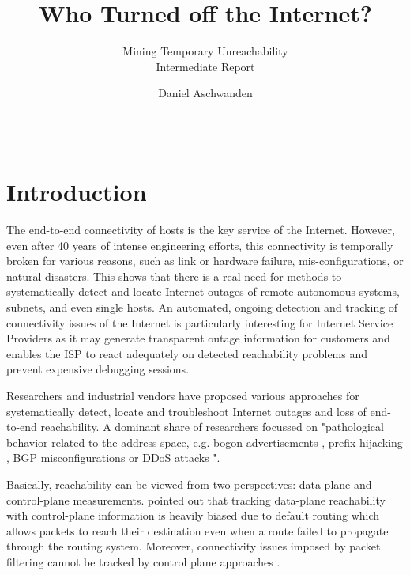 \documentclass{sigcomm-alternate}
\begin{document}
 
\title{Who Turned off the Internet?} 
\subtitle{Mining Temporary Unreachability\\ \Large Intermediate Report }

\author{ \alignauthor Daniel Aschwanden\\
\\
\\
}

\maketitle 
\section{Introduction}
The end-to-end connectivity of hosts is the key service of the Internet. However, even after 40 years of intense engineering efforts, this connectivity is temporally broken for various reasons, such as link or hardware failure, mis-configurations, or natural disasters. 
This shows that there is a real need for methods to systematically detect and locate Internet outages of remote autonomous systems, subnets, and even single hosts. An automated, ongoing detection and tracking of connectivity issues of the Internet is particularly interesting for Internet Service Providers as it may generate transparent outage information for customers and enables the ISP to react adequately on detected reachability problems and prevent expensive debugging sessions.

Researchers and industrial vendors have proposed various approaches for systematically detect, locate and troubleshoot Internet outages and loss of end-to-end reachability. %
A dominant share of researchers focussed on "pathological behavior related to the address space, e.g. bogon advertisements \cite{Feamster:2005}, prefix hijacking \cite{Zhang:2010}, BGP misconfigurations \cite{Mahajan:2002} or DDoS attacks \cite{Chen:2001}"\cite{Bush:Optometry}.

Basically, reachability can be viewed from two perspectives: data-plane and control-plane measurements. \cite{Bush:Optometry} pointed out that tracking data-plane reachability with control-plane information is heavily biased due to default routing which allows packets to reach their destination even when a route failed to propagate through the routing system. Moreover, connectivity issues imposed by packet filtering cannot be tracked by control plane approaches \cite{Dainotti:2011:ACI}. 
\end{document}
